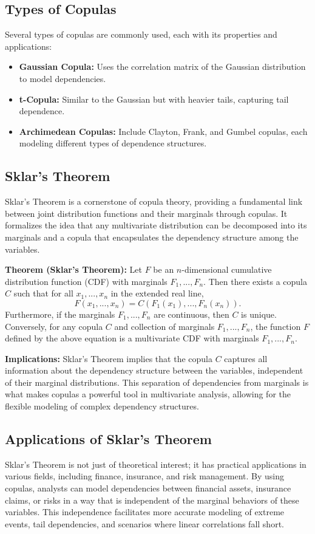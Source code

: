 \documentclass{article}
\begin{document}
\subsection{Types of Copulas}
Several types of copulas are commonly used, each with its properties and applications:
\begin{itemize}
    \item \textbf{Gaussian Copula:} Uses the correlation matrix of the Gaussian distribution to model dependencies.
    \item \textbf{t-Copula:} Similar to the Gaussian but with heavier tails, capturing tail dependence.
    \item \textbf{Archimedean Copulas:} Include Clayton, Frank, and Gumbel copulas, each modeling different types of dependence structures.
\end{itemize}
\subsection{Sklar's Theorem}
Sklar's Theorem is a cornerstone of copula theory, providing a fundamental link between joint distribution functions and their marginals through copulas. It formalizes the idea that any multivariate distribution can be decomposed into its marginals and a copula that encapsulates the dependency structure among the variables.

\textbf{Theorem (Sklar's Theorem):} Let $F$ be an $n$-dimensional cumulative distribution function (CDF) with marginals $F_1, ..., F_n$. Then there exists a copula $C$ such that for all $x_1, ..., x_n$ in the extended real line,
$$
F(x_1, ..., x_n) = C(F_1(x_1), ..., F_n(x_n)).
$$
Furthermore, if the marginals $F_1, ..., F_n$ are continuous, then $C$ is unique. Conversely, for any copula $C$ and collection of marginals $F_1, ..., F_n$, the function $F$ defined by the above equation is a multivariate CDF with marginals $F_1, ..., F_n$.

\textbf{Implications:} Sklar's Theorem implies that the copula $C$ captures all information about the dependency structure between the variables, independent of their marginal distributions. This separation of dependencies from marginals is what makes copulas a powerful tool in multivariate analysis, allowing for the flexible modeling of complex dependency structures.

\subsection{Applications of Sklar's Theorem}
Sklar's Theorem is not just of theoretical interest; it has practical applications in various fields, including finance, insurance, and risk management. By using copulas, analysts can model dependencies between financial assets, insurance claims, or risks in a way that is independent of the marginal behaviors of these variables. This independence facilitates more accurate modeling of extreme events, tail dependencies, and scenarios where linear correlations fall short.
\end{document}
